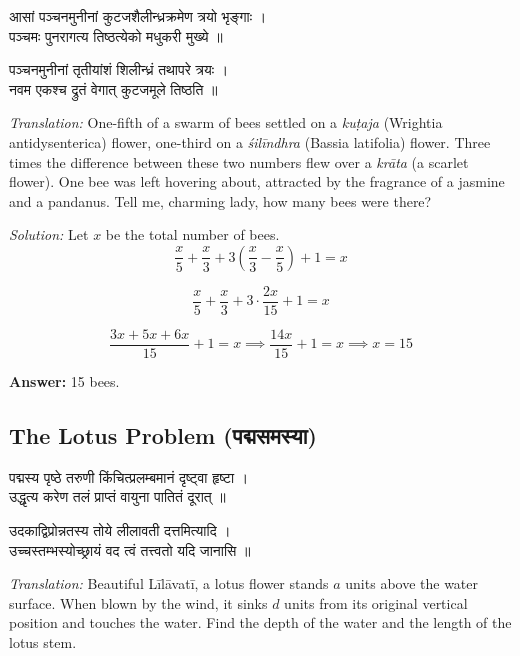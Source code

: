 \documentclass[10pt,a4paper]{article}
\newenvironment{sanskritverse}{%
  \begin{center}%
  \begin{minipage}{0.94\textwidth}%
  \centering\devanagarifont\small%
}{%
  \end{minipage}%
  \end{center}%
  \vspace{0.1em}%
}
\begin{document}
\begin{sanskritverse}
आसां पञ्चनमुनीनां कुटजशैलीन्ध्रक्रमेण त्रयो भृङ्गाः ।\\
पञ्चमः पुनरागत्य तिष्ठत्येको मधुकरी मुख्ये ॥
\end{sanskritverse}

\begin{sanskritverse}
पञ्चनमुनीनां तृतीयांशं शिलीन्ध्रं तथापरे त्रयः ।\\
नवम एकश्च द्रुतं वेगात् कुटजमूले तिष्ठति ॥
\end{sanskritverse}

\textit{Translation:} One-fifth of a swarm of bees settled on a \textit{kuṭaja} (Wrightia antidysenterica) flower, one-third on a \textit{śilīndhra} (Bassia latifolia) flower. Three times the difference between these two numbers flew over a \textit{krāta} (a scarlet flower). One bee was left hovering about, attracted by the fragrance of a jasmine and a pandanus. Tell me, charming lady, how many bees were there?

\textit{Solution:} Let $x$ be the total number of bees.
\[
\frac{x}{5} + \frac{x}{3} + 3\left(\frac{x}{3} - \frac{x}{5}\right) + 1 = x
\]

\[
\frac{x}{5} + \frac{x}{3} + 3 \cdot \frac{2x}{15} + 1 = x
\]

\[
\frac{3x + 5x + 6x}{15} + 1 = x \implies \frac{14x}{15} + 1 = x \implies x = 15
\]

\textbf{Answer:} 15 bees.

\subsection*{The Lotus Problem (पद्मसमस्या)}

\begin{sanskritverse}
पद्मस्य पृष्ठे तरुणी किंचित्प्रलम्बमानं दृष्ट्वा हृष्टा ।\\
उद्धृत्य करेण तलं प्राप्तं वायुना पातितं दूरात् ॥
\end{sanskritverse}

\begin{sanskritverse}
उदकाद्विप्रोन्नतस्य तोये लीलावती दत्तमित्यादि ।\\
उच्चस्तम्भस्योच्छ्रायं वद त्वं तत्त्वतो यदि जानासि ॥
\end{sanskritverse}

\textit{Translation:} Beautiful Līlāvatī, a lotus flower stands $a$ units above the water surface. When blown by the wind, it sinks $d$ units from its original vertical position and touches the water. Find the depth of the water and the length of the lotus stem.
\end{document}
